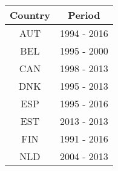 \begin{tabular}{cc}
Country & Period\\  \hline 
AUT&1994 - 2016\\
BEL&1995 - 2000\\
CAN&1998 - 2013\\
DNK&1995 - 2013\\
ESP&1995 - 2016\\
EST&2013 - 2013\\
FIN&1991 - 2016\\
NLD&2004 - 2013\\
\hline \end{tabular}
